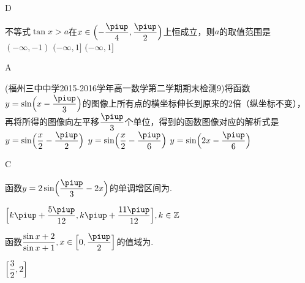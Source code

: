 \begin{exercise}
\begin{minipage}[h]{0.2\linewidth}
      \end{minipage}
      \begin{answer}
        D
      \end{answer}
    \item%
      不等式$\tan x>a$在$x\in\Bigl(-\dfrac{\piup}4,\dfrac{\piup}2 \Bigr)$上恒成立，则$a$的取值范围是\xz
      \xx{$(-\infty,-1]$}
        {$(-\infty,-1)$}
        {$(-\infty,1]$}
        {$(-\infty,1]$}
      \begin{answer}
        A
      \end{answer}
    \item%
      (福州三中中学2015-2016学年高一数学第二学期期末检测9)将函数$y=\sin\Bigl(x-\dfrac{\piup}3\Bigr)$的图像上所有点的横坐标伸长到原来的2倍（纵坐标不变），再将所得的图像向左平移$\dfrac{\piup}3$个单位，得到的函数图像对应的解析式是\xz
        {$y=\sin\Bigl(\dfrac x2-\dfrac{\piup}2\Bigr)$}
        {$y=\sin\Bigl(\dfrac{x}2-\dfrac{\piup}6\Bigr)$}
        {$y=\sin\Bigl(2x-\dfrac{\piup}6\Bigr)$}
      \begin{answer}
        C
      \end{answer}
    \item%
      函数$y=2\sin\Bigl(\dfrac{\piup}3-2x \Bigr)$的单调增区间为\tk.
      \begin{answer}
        $\Bigl[k\piup+\dfrac{5\piup}{12},k\piup+\dfrac{11\piup}{12} \Bigr],k\in\mathbb{Z}$
      \end{answer}
    \item%
      函数$\dfrac{\sin x+2}{\sin x+1},x\in\Bigl[0,\dfrac{\piup}2\Bigr]$的值域为\tk.
      \begin{answer}
        $\Bigl[\dfrac32,2\Bigr]$
      \end{answer}


\end{exercise}
